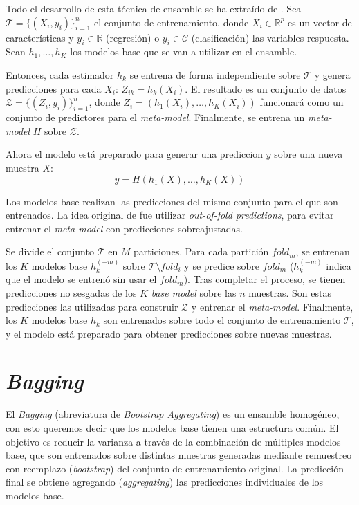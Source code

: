 \documentclass[titlepage, 11pt]{book}
\begin{document}
Todo el desarrollo de esta técnica de ensamble se ha extraído de \cite{wolpert1992stacked}. Sea $\mathcal{T}=\{(X_i,y_i)\}^n_{i=1}$ el conjunto de entrenamiento, donde $X_i \in \mathbb{R}^p$ es un vector de características y $y_i \in \mathbb{R}$ (regresión) o $y_i \in \mathcal{C}$ (clasificación) las variables respuesta. Sean $h_1,\ldots,h_K$ los modelos base que se van a utilizar en el ensamble.

Entonces, cada estimador $h_k$ se entrena de forma independiente sobre $\mathcal{T}$ y genera predicciones para cada $X_i$: $Z_{ik}=h_k(X_i)$. El resultado es un conjunto de datos $\mathcal{Z}=\{(Z_i,y_i)\}^n_{i=1}$, donde $Z_i=(h_1(X_i),\ldots,h_K(X_i))$ funcionará como un conjunto de predictores para el \textit{meta-model}. Finalmente, se entrena un \textit{meta-model} $H$ sobre $\mathcal{Z}$.

Ahora el modelo está preparado para generar una prediccion $y$ sobre una nueva muestra $X$:
\begin{equation*}
    y=H(h_1(X),\ldots,h_K(X))
\end{equation*}

Los modelos base realizan las predicciones del mismo conjunto para el que son entrenados. La idea original de \cite{wolpert1992stacked} fue utilizar \textit{out-of-fold predictions}, para evitar entrenar el \textit{meta-model} con predicciones sobreajustadas.

Se divide el conjunto $\mathcal{T}$ en $M$ particiones. Para cada partición $fold_m$, se entrenan los $K$ modelos base $h_k^{(-m)}$ sobre $\mathcal{T} \setminus fold_i$ y se predice sobre $fold_m$ ($h_k^{(-m)}$ indica que el modelo se entrenó sin usar el $fold_m$). Tras completar el proceso, se tienen predicciones no sesgadas de los $K$ \textit{base model} sobre las $n$ muestras. Son estas predicciones las utilizadas para construir $\mathcal{Z}$ y entrenar el \textit{meta-model}. Finalmente, los $K$ modelos base $h_k$ son entrenados sobre todo el conjunto de entrenamiento $\mathcal{T}$, y el modelo está preparado para obtener predicciones sobre nuevas muestras.

\section{\textit{Bagging}}
El \textit{Bagging} (abreviatura de \textit{Bootstrap Aggregating}) es un ensamble homogéneo, con esto queremos decir que los modelos base tienen una estructura común. El objetivo es reducir la varianza a través de la combinación de múltiples modelos base, que son entrenados sobre distintas muestras generadas mediante remuestreo con reemplazo (\textit{bootstrap}) del conjunto de entrenamiento original. La predicción final se obtiene agregando (\textit{aggregating}) las predicciones individuales de los modelos base.
\end{document}
